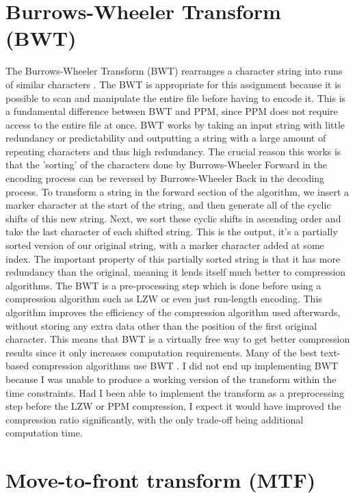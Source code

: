 \documentclass[a4paper, 11pt]{article}
\numberwithin{equation}{section}
\begin{document}
\section{Burrows-Wheeler Transform (BWT)}

The Burrows-Wheeler Transform (BWT) rearranges a character string into runs of similar characters \cite{burrows1994block}. 
The BWT is appropriate for this assignment because it is possible to scan and manipulate the entire file 
before having to encode it. 
This is a fundamental difference between BWT and PPM, since PPM does not require access to the entire file 
at once. 
BWT works by taking an input string with little redundancy or predictability and outputting a string with 
a large amount of repeating characters and thus high redundancy. 
The crucial reason this works is that the 'sorting' of the characters done by Burrows-Wheeler Forward 
in the encoding process can be reversed by Burrows-Wheeler Back in the decoding process. 
To transform a string in the forward section of the algorithm, we insert a marker character at the start 
of the string, and then generate all of the cyclic shifts of this new string. 
Next, we sort these cyclic shifts in ascending order and take the last character of each shifted string. 
This is the output, it's a partially sorted version of our original string, with a marker character added 
at some index. 
The important property of this partially sorted string is that it has more redundancy than the original, 
meaning it lends itself much better to compression algorithms. 
The BWT is a pre-processing step which is done before using a compression algorithm such as LZW or 
even just run-length encoding. 
This algorithm improves the efficiency of the compression algorithm used afterwards, without storing 
any extra data other than the position of the first original character. 
This means that BWT is a virtually free way to get better compression results since it only increases 
computation requirements. 
Many of the best text-based compression algorithms use BWT \cite{TextBenchmark}. 
I did not end up implementing BWT because I was unable to produce a working version of the transform 
within the time constraints. 
Had I been able to implement the transform as a preprocessing step before the LZW or PPM compression, I expect 
it would have improved the compression ratio significantly, with the only trade-off being additional computation time. 


\section{Move-to-front transform (MTF)}
\end{document}
